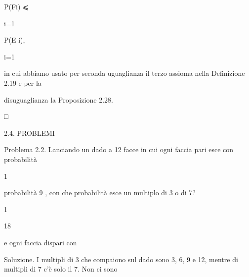 \documentclass[a4paper,portrait,12pt]{article}
\begin{document}
\begin{flushleft}
P(Fi) ⩽
\end{flushleft}


\begin{flushleft}
i=1
\end{flushleft}





\begin{flushleft}
P(E i),
\end{flushleft}


\begin{flushleft}
i=1
\end{flushleft}





\begin{flushleft}
in cui abbiamo usato per seconda uguaglianza il terzo assioma nella Definizione 2.19 e per la
\end{flushleft}


\begin{flushleft}
disuguaglianza la Proposizione 2.28.
\end{flushleft}


□





\begin{flushleft}
2.4. PROBLEMI
\end{flushleft}


\begin{flushleft}
Problema 2.2. Lanciando un dado a 12 facce in cui ogni faccia pari esce con probabilit\`{a}
\end{flushleft}


1


\begin{flushleft}
probabilit\`{a} 9 , con che probabilit\`{a} esce un multiplo di 3 o di 7?
\end{flushleft}





1


18





\begin{flushleft}
e ogni faccia dispari con
\end{flushleft}





\begin{flushleft}
Soluzione. I multipli di 3 che compaiono sul dado sono 3, 6, 9 e 12, mentre di multipli di 7 c'\`{e} solo il 7. Non ci sono
\end{flushleft}
\end{document}
